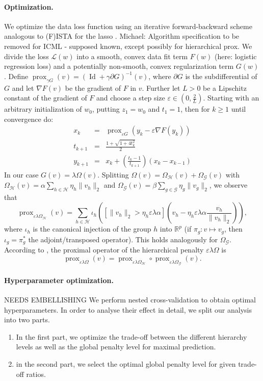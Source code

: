 \documentclass{article}
\DeclareMathOperator{\prox}{prox}
\DeclareMathOperator{\Id}{Id}
\newcommand{\R}{\mathbb{R}}
\begin{document}
\paragraph{Optimization.}
We optimize the data loss function using an iterative forward-backward
scheme analogous to (F)ISTA for the lasso \cite{beck2009}. 
{\color{red} Michael: Algorithm specification to be removed for ICML - supposed known, except possibly for hierarchical prox.}
We divide the
loss \(\mathcal L(w)\) into a smooth, convex data fit term \(F(w)\) (here: 
logistic regression loss) and a potentially non-smooth, convex 
regularization term \(G(w)\). 
Define \(\prox_{\gamma G}(v) = (\Id + \gamma\partial G)^{-1}(v)\), where \(\partial G\) is the subdifferential of \(G\) and 
let \(\nabla F(v)\) be the gradient of \(F\) in \(v\). Further let \(L > 0\)
be a Lipschitz constant of the gradient of \(F\) and choose a step size
\(\varepsilon\in (0, \frac{2}{L})\). Starting with an arbitrary 
initialization of \(w_0\), putting \(z_1 = w_0\) and \(t_1 = 1\), then for
\(k\geq 1\) until convergence do:
\begin{eqnarray*}
  x_k & = & \prox_{\varepsilon G}(y_k - \varepsilon\nabla F(y_k))\\
  t_{k + 1} & = & \frac{1 + \sqrt{1 + 4 t_k^2}}{2}\\
  y_{k + 1} & = & x_k + \left(\frac{t_k - 1}{t_{k + 1}}\right)(x_k - x_{k - 1})
\end{eqnarray*}
In our case \(G(v) = \lambda\Omega(v)\). Splitting \(\Omega(v) = \Omega_{\mathcal H}(v) + \Omega_{\mathcal G}(v)\) with 
\(\Omega_{\mathcal H}(v) = \alpha\sum_{h\in\mathcal H}\eta_h\|v_h\|_2\) and
\(\Omega_{\mathcal G}(v) = \beta\sum_{g\in\mathcal G}\eta_g\|v_g\|_2\), we observe
that \[\prox_{\varepsilon\lambda\Omega_{\mathcal H}}(v) = \sum_{h\in\mathcal H}\iota_h\left([\|v_h\|_2 > \eta_h\varepsilon\lambda\alpha]\left(v_h - \eta_h\varepsilon\lambda\alpha\frac{v_h}{\|v_h\|_2}\right)\right),\]
where \(\iota_h\) is the canonical injection of the group \(h\) into 
\(\R^p\) (if \(\pi_g: v\mapsto v_g\), then \(\iota_g = \pi_g^\ast\) the 
adjoint/transposed operator). This holds analogously for 
\(\Omega_{\mathcal G}\).
According to \cite{jenatton2011}, the proximal operator of 
the hierarchical penalty \(\varepsilon\lambda\Omega\) is
\[\prox_{\varepsilon\lambda\Omega}(v) = \prox_{\varepsilon\lambda\Omega_{\mathcal H}}\circ\prox_{\varepsilon\lambda\Omega_{\mathcal G}}(v).\]

\paragraph{Hyperparameter optimization.}
{\color{red} NEEDS EMBELLISHING}
We perform nested cross-validation to obtain optimal hyperparameters. 
In order to analyse their effect in detail, we split our analysis into two 
parts.
\begin{enumerate}
\item In the first part, we optimize the trade-off between the different hierarchy levels as well as the global penalty level for maximal prediction.
\item in the second part, we select the optimal global penalty level for 
given trade-off ratios.
\end{enumerate}
\end{document}
